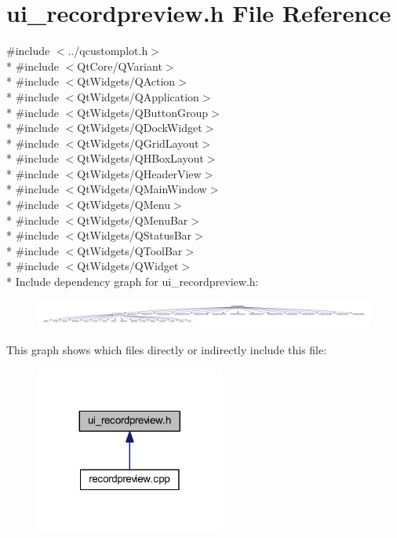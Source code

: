 \hypertarget{a00140}{\section{ui\+\_\+recordpreview.\+h File Reference}
\label{a00140}
}
{\ttfamily \#include $<$../qcustomplot.\+h$>$}\\*
{\ttfamily \#include $<$Qt\+Core/\+Q\+Variant$>$}\\*
{\ttfamily \#include $<$Qt\+Widgets/\+Q\+Action$>$}\\*
{\ttfamily \#include $<$Qt\+Widgets/\+Q\+Application$>$}\\*
{\ttfamily \#include $<$Qt\+Widgets/\+Q\+Button\+Group$>$}\\*
{\ttfamily \#include $<$Qt\+Widgets/\+Q\+Dock\+Widget$>$}\\*
{\ttfamily \#include $<$Qt\+Widgets/\+Q\+Grid\+Layout$>$}\\*
{\ttfamily \#include $<$Qt\+Widgets/\+Q\+H\+Box\+Layout$>$}\\*
{\ttfamily \#include $<$Qt\+Widgets/\+Q\+Header\+View$>$}\\*
{\ttfamily \#include $<$Qt\+Widgets/\+Q\+Main\+Window$>$}\\*
{\ttfamily \#include $<$Qt\+Widgets/\+Q\+Menu$>$}\\*
{\ttfamily \#include $<$Qt\+Widgets/\+Q\+Menu\+Bar$>$}\\*
{\ttfamily \#include $<$Qt\+Widgets/\+Q\+Status\+Bar$>$}\\*
{\ttfamily \#include $<$Qt\+Widgets/\+Q\+Tool\+Bar$>$}\\*
{\ttfamily \#include $<$Qt\+Widgets/\+Q\+Widget$>$}\\*
Include dependency graph for ui\+\_\+recordpreview.\+h\+:
\nopagebreak
\begin{figure}[H]
\begin{center}
\leavevmode
\includegraphics[width=350pt]{d2/de1/a00421}
\end{center}
\end{figure}
This graph shows which files directly or indirectly include this file\+:
\nopagebreak
\begin{figure}[H]
\begin{center}
\leavevmode
\includegraphics[width=176pt]{db/d43/a00422}
\end{center}
\end{figure}
